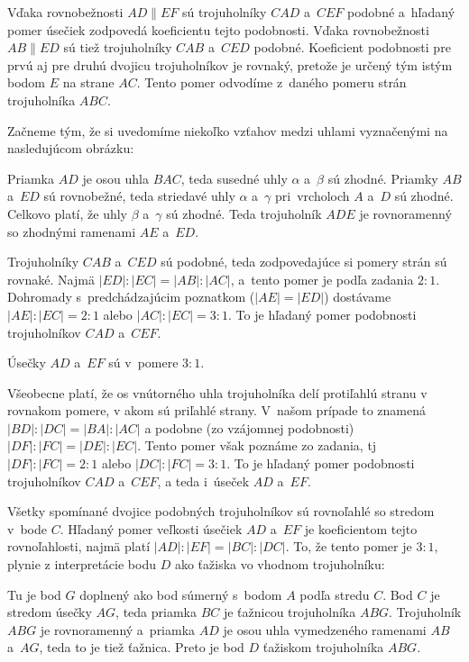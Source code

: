 {%
Vďaka rovnobežnosti $AD\|EF$ sú trojuholníky $CAD$ a~$CEF$ podobné a~hľadaný pomer úsečiek zodpovedá koeficientu tejto podobnosti.
Vďaka rovnobežnosti $AB\|ED$ sú tiež trojuholníky $CAB$ a~$CED$ podobné.
Koeficient podobnosti pre prvú aj pre druhú dvojicu trojuholníkov je rovnaký, pretože je určený tým istým bodom $E$ na strane $AC$.
Tento pomer odvodíme z~daného pomeru strán trojuholníka $ABC$.

Začneme tým, že si uvedomíme niekoľko vzťahov medzi uhlami vyznačenými na nasledujúcom obrázku:
%

Priamka $AD$ je osou uhla $BAC$, teda susedné uhly $\alpha$ a~$\beta$ sú zhodné.
Priamky $AB$ a~$ED$ sú rovnobežné, teda striedavé uhly $\alpha$ a~$\gamma$ pri~vrcholoch $A$ a~$D$ sú zhodné.
Celkovo platí, že uhly $\beta$ a~$\gamma$ sú zhodné.
Teda trojuholník $ADE$ je rovnoramenný so zhodnými ramenami $AE$ a~$ED$.

Trojuholníky $CAB$ a~$CED$ sú podobné, teda zodpovedajúce si pomery strán sú rovnaké.
Najmä $|ED|:|EC| =|AB|:|AC|$, a~tento pomer je podľa zadania $2:1$.
Dohromady s~predchádzajúcim poznatkom ($|AE|=|ED|$) dostávame $|AE|:|EC| =2:1$ alebo $|AC|:|EC| =3:1$.
To je hľadaný pomer podobnosti trojuholníkov $CAD$ a~$CEF$.

Úsečky $AD$ a~$EF$ sú v~pomere $3:1$.

\poznamky
Všeobecne platí, že os vnútorného uhla trojuholníka delí protiľahlú stranu v rovnakom pomere, v akom sú priľahlé strany.
V~našom prípade to znamená $|BD|:|DC| =|BA|:|AC|$ a podobne (zo vzájomnej podobnosti) $|DF|:|FC| =|DE|:|EC|$.
Tento pomer však poznáme zo zadania, tj $|DF|:|FC|=2:1$ alebo $|DC|:|FC| =3:1$.
To je hľadaný pomer podobnosti trojuholníkov $CAD$ a~$CEF$, a teda i~úseček $AD$ a~$EF$.

Všetky spomínané dvojice podobných trojuholníkov sú rovnoľahlé so stredom v~bode $C$.
Hľadaný pomer veľkosti úsečiek $AD$ a~$EF$ je koeficientom tejto rovnoľahlosti, najmä platí $|AD|:|EF|=|BC|:|DC|$.
To, že tento pomer je $3:1$, plynie z interpretácie bodu $D$ ako ťažiska vo vhodnom trojuholníku:
%

Tu je bod $G$ doplnený ako bod súmerný s~bodom $A$ podľa stredu $C$.
Bod $C$ je stredom úsečky $AG$, teda priamka $BC$ je ťažnicou trojuholníka $ABG$.
Trojuholník $ABG$ je rovnoramenný a~priamka $AD$ je osou uhla vymedzeného ramenami $AB$ a~$AG$, teda to je tiež ťažnica.
Preto je bod $D$ ťažiskom trojuholníka $ABG$.
}


